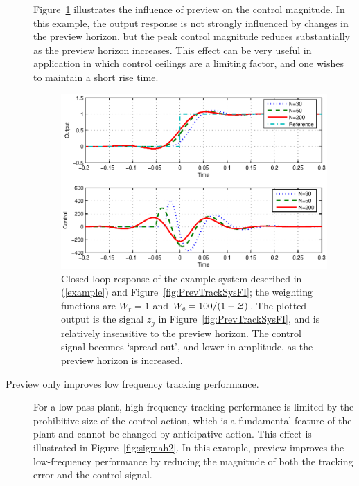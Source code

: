 \begin{description}
Figure~\ref{fig:ReducingControlWithIncreasingN} illustrates the influence of preview on the control magnitude. In this example, the output response is not strongly influenced by changes in the preview horizon, but the peak control magnitude reduces substantially as the preview horizon increases. This effect can be very useful in application in which control ceilings are a limiting factor, and one wishes to maintain a short rise time.
\begin{figure}
\includegraphics[width=\columnwidth]{./diags/ReducingControlWithIncreasingN.eps}
\caption{Closed-loop response of the example system described in (\ref{example}) and Figure~\ref{fig:PrevTrackSysFI}; the weighting functions are $W_r=1$ and $W_e=100/(1-\mathcal{Z})$. The plotted output is the signal $z_g$ in Figure~\ref{fig:PrevTrackSysFI}, and is relatively insensitive to the preview horizon. The control signal becomes `spread out', and lower in amplitude, as the preview horizon is increased. \label{fig:ReducingControlWithIncreasingN}}
\end{figure}
\item[Preview only improves low frequency tracking performance.] For a low-pass plant, high frequency tracking performance is limited by the prohibitive size of the control action, which is a fundamental feature of the plant and cannot be changed by anticipative action. This effect is illustrated in Figure~\ref{fig:sigmah2}. In this example, preview improves the low-frequency performance by reducing the magnitude of both the tracking error and the control signal. %
\begin{figure}

\end{figure}
\end{description}
